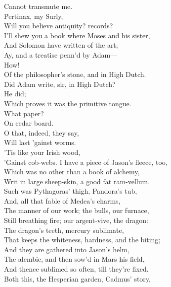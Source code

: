 \documentclass[a4paper,oneside]{memoir}
\begin{document}
\begin{drama*}
Cannot transmute me.\\
\mammonspeaks {} Pertinax, my Surly,\\
Will you believe antiquity? records?\\
I'll shew you a book where Moses and his sister,\\
And Solomon have written of the art;\\
Ay, and a treatise penn'd by Adam---\\
\surlyspeaks {} How!\\
\mammonspeaks Of the philosopher's stone, and in High Dutch.\\
\surlyspeaks Did Adam write, sir, in High Dutch?\\
\mammonspeaks {} He did;\\
Which proves it was the primitive tongue.\\
\surlyspeaks {} What paper?\\
\mammonspeaks On cedar board.\\
\surlyspeaks {} O that, indeed, they say,\\
Will last 'gainst worms.\\
\mammonspeaks {} 'Tis like your Irish wood,\\
'Gainst cob-webs. I have a piece of Jason's fleece, too,\\
Which was no other than a book of alchemy,\\
Writ in large sheep-skin, a good fat ram-vellum.\\
Such was Pythagoras' thigh, Pandora's tub,\\
And, all that fable of Medea's charms,\\
The manner of our work; the bulls, our furnace,\\
Still breathing fire; our argent-vive, the dragon:\\
The dragon's teeth, mercury sublimate,\\
That keeps the whiteness, hardness, and the biting;\\
And they are gathered into Jason's helm,\\
The alembic, and then sow'd in Mars his field,\\
And thence sublimed so often, till they're fixed.\\
Both this, the Hesperian garden, Cadmus' story,\\

\end{drama*}
\end{document}
